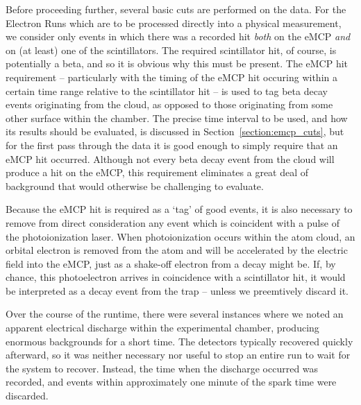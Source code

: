 Before proceeding further, several basic cuts are performed on the data.  For the Electron Runs which are to be processed directly into a physical measurement, we consider only events in which there was a recorded hit \emph{both} on the eMCP \emph{and} on (at least) one of the scintillators.  The required scintillator hit, of course, is potentially a beta, and so it is obvious why this must be present.  The eMCP hit requirement -- particularly with the timing of the eMCP hit occuring within a certain time range relative to the scintillator hit -- is used to tag beta decay events originating from the cloud, as opposed to those originating from some other surface within the chamber.   The precise time interval to be used, and how its results should be evaluated, is discussed in Section~\ref{section:emcp_cuts}, but for the first pass through the data it is good enough to simply require that an eMCP hit occurred.  Although not every beta decay event from the cloud will produce a hit on the eMCP, this requirement eliminates a great deal of background that would otherwise be challenging to evaluate.    
 
Because the eMCP hit is required as a `tag' of good events, it is also necessary to remove from direct consideration any event which is coincident with a pulse of the photoionization laser.  When photoionization occurs within the atom cloud, an orbital electron is removed from the atom and will be accelerated by the electric field into the eMCP, just as a shake-off electron from a decay might be.  If, by chance, this photoelectron arrives in coincidence with a scintillator hit, it would be interpreted as a decay event from the trap -- unless we preemtively discard it.  


Over the course of the runtime, there were several instances where we noted an apparent electrical discharge within the experimental chamber, producing enormous backgrounds for a short time.  The detectors typically recovered quickly afterward, so it was neither necessary nor useful to stop an entire run to wait for the system to recover.  Instead, the time when the discharge occurred was recorded, and events within approximately one minute of the spark time were discarded.  

